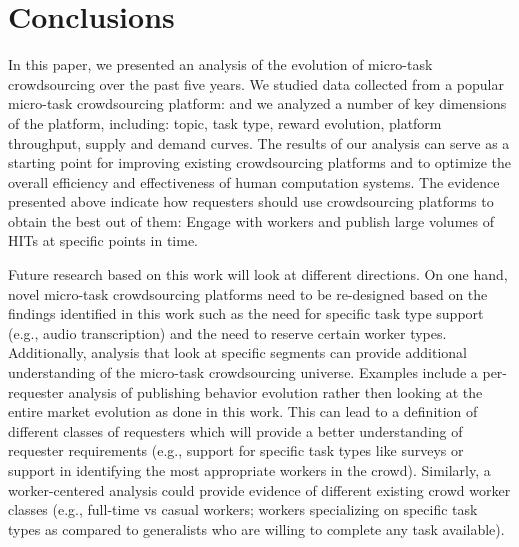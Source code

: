 \section{Conclusions}\label{sec:conc}

In this paper, we presented an analysis of the evolution of micro-task crowdsourcing over the past five years.
We studied data collected from a popular micro-task crowdsourcing platform: \amt{}
and we analyzed a number of key dimensions of the platform, including: topic, task type,  reward evolution, platform throughput, supply and demand curves. The results of our analysis can serve as a starting point for improving existing crowdsourcing platforms and to optimize the overall efficiency and effectiveness of human computation systems. The evidence presented above  indicate how requesters should use crowdsourcing platforms to obtain the best out of them: Engage with workers and publish large volumes of HITs at specific points in time. 


Future research based on this work will look at different directions. On one hand, novel micro-task crowdsourcing platforms need to be re-designed based on the findings identified in this work such as the need for specific task type support (e.g., audio transcription) and the need to reserve certain worker types.
% 
Additionally, analysis that look at specific segments can provide additional understanding of the micro-task crowdsourcing universe. Examples include a per-requester analysis of publishing behavior evolution rather then looking at the entire market evolution as done in this work. This can lead to a definition of different classes of requesters which will provide a better understanding of requester requirements (e.g., support for specific task types like surveys or support in identifying the most appropriate workers in the crowd). Similarly, a worker-centered analysis could provide evidence of different existing crowd worker classes (e.g., full-time vs casual workers; workers specializing on specific task types as compared to generalists  who are willing to complete any task available).